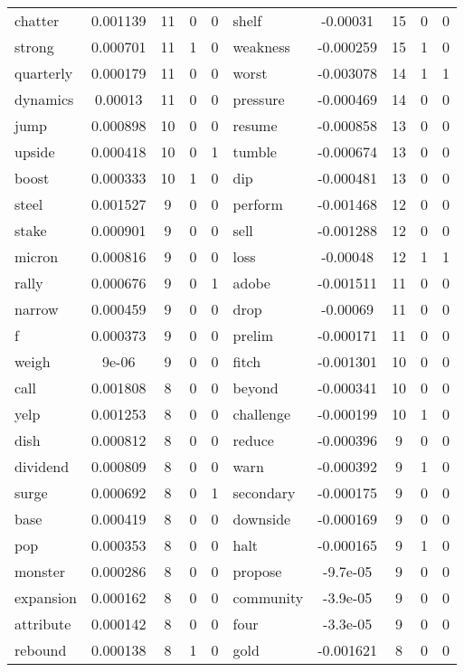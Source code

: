 \documentclass[ oneside,tikz,%
                    author={Joshua Felmeden},
                    degree={MEng},
                     title={Semantic Analysis of Financial Headlines Based on Realised Stock Returns},
                  subtitle={Research}]{dissertation}
\begin{document}
\begin{table}
\begin{tabular}{lcccclcccc}
chatter & 0.001139 & 11 & 0 & 0 & shelf & -0.00031 & 15 & 0 & 0 \\
strong & 0.000701 & 11 & 1 & 0 & weakness & -0.000259 & 15 & 1 & 0 \\
quarterly & 0.000179 & 11 & 0 & 0 & worst & -0.003078 & 14 & 1 & 1 \\
dynamics & 0.00013 & 11 & 0 & 0 & pressure & -0.000469 & 14 & 0 & 0 \\
jump & 0.000898 & 10 & 0 & 0 & resume & -0.000858 & 13 & 0 & 0 \\
upside & 0.000418 & 10 & 0 & 1 & tumble & -0.000674 & 13 & 0 & 0 \\
boost & 0.000333 & 10 & 1 & 0 & dip & -0.000481 & 13 & 0 & 0 \\
steel & 0.001527 & 9 & 0 & 0 & perform & -0.001468 & 12 & 0 & 0 \\
stake & 0.000901 & 9 & 0 & 0 & sell & -0.001288 & 12 & 0 & 0 \\
micron & 0.000816 & 9 & 0 & 0 & loss & -0.00048 & 12 & 1 & 1 \\
rally & 0.000676 & 9 & 0 & 1 & adobe & -0.001511 & 11 & 0 & 0 \\
narrow & 0.000459 & 9 & 0 & 0 & drop & -0.00069 & 11 & 0 & 0 \\
f & 0.000373 & 9 & 0 & 0 & prelim & -0.000171 & 11 & 0 & 0 \\
weigh & 9e-06 & 9 & 0 & 0 & fitch & -0.001301 & 10 & 0 & 0 \\
call & 0.001808 & 8 & 0 & 0 & beyond & -0.000341 & 10 & 0 & 0 \\
yelp & 0.001253 & 8 & 0 & 0 & challenge & -0.000199 & 10 & 1 & 0 \\
dish & 0.000812 & 8 & 0 & 0 & reduce & -0.000396 & 9 & 0 & 0 \\
dividend & 0.000809 & 8 & 0 & 0 & warn & -0.000392 & 9 & 1 & 0 \\
surge & 0.000692 & 8 & 0 & 1 & secondary & -0.000175 & 9 & 0 & 0 \\
base & 0.000419 & 8 & 0 & 0 & downside & -0.000169 & 9 & 0 & 0 \\
pop & 0.000353 & 8 & 0 & 0 & halt & -0.000165 & 9 & 1 & 0 \\
monster & 0.000286 & 8 & 0 & 0 & propose & -9.7e-05 & 9 & 0 & 0 \\
expansion & 0.000162 & 8 & 0 & 0 & community & -3.9e-05 & 9 & 0 & 0 \\
attribute & 0.000142 & 8 & 0 & 0 & four & -3.3e-05 & 9 & 0 & 0 \\
rebound & 0.000138 & 8 & 1 & 0 & gold & -0.001621 & 8 & 0 & 0 \\

\end{tabular}
\end{table}
\end{document}
